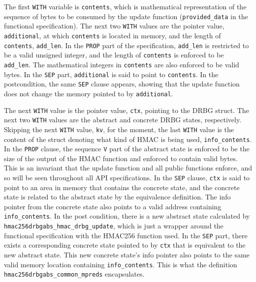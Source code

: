 \documentclass[pageno]{jpaper}
\begin{document}
The first \lstinline{WITH} variable is \lstinline{contents}, which is mathematical representation of the sequence of bytes to be consumed by the update function (\lstinline{provided_data} in the functional specification). The next two \lstinline{WITH} values are the pointer value, \lstinline{additional}, at which \lstinline{contents} is located in memory, and the length of \lstinline{contents}, \lstinline{add_len}. In the \lstinline{PROP} part of the specification, \lstinline{add_len} is restricted to be a valid unsigned integer, and the length of \lstinline{contents} is enforced to be \lstinline{add_len}. The mathematical integers in \lstinline{contents} are also enforced to be valid bytes. In the \lstinline{SEP} part, \lstinline{additional} is said to point to \lstinline{contents}. In the postcondition, the same \lstinline{SEP} clause appears, showing that the update function does not change the memory pointed to by \lstinline{additional}.

The next \lstinline{WITH} value is the pointer value, \lstinline{ctx}, pointing to the DRBG struct. The next two \lstinline{WITH} values are the abstract and concrete DRBG states, respectively. Skipping the next \lstinline{WITH} value, \lstinline{kv}, for the moment, the last \lstinline{WITH} value is the content of the struct denoting what kind of HMAC is being used, \lstinline{info_contents}. In the \lstinline{PROP} clause, the sequence \lstinline{V} part of the abstract state is enforced to be the size of the output of the HMAC function and enforced to contain valid bytes. This is an invariant that the update function and all public functions enforce, and so will be seen throughout all API specifications. In the \lstinline{SEP} clause, \lstinline{ctx} is said to point to an area in memory that contains the concrete state, and the concrete state is related to the abstract state by the equivalence definition. The info pointer from the concrete state also points to a valid address containing \lstinline{info_contents}. In the post condition, there is a new abstract state calculated by \lstinline{hmac256drbgabs_hmac_drbg_update}, which is just a wrapper around the functional specification with the HMAC256 function used. In the \lstinline{SEP} part, there exists a corresponding concrete state pointed to by \lstinline{ctx} that is equivalent to the new abstract state. This new concrete state’s info pointer also points to the same valid memory location containing \lstinline{info_contents}. This is what the definition \lstinline{hmac256drbgabs_common_mpreds} encapsulates.
\end{document}
